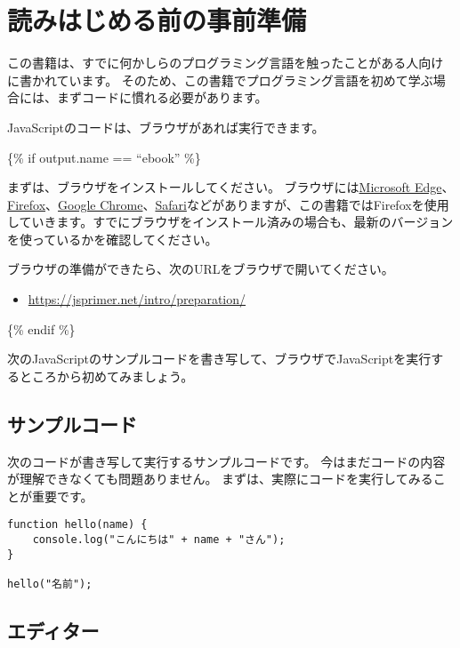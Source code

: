 \hypertarget{preparation}{%
\chapter*{読みはじめる前の事前準備}\label{preparation}}

この書籍は、すでに何かしらのプログラミング言語を触ったことがある人向けに書かれています。
そのため、この書籍でプログラミング言語を初めて学ぶ場合には、まずコードに慣れる必要があります。

JavaScriptのコードは、ブラウザがあれば実行できます。

\{\% if output.name == ``ebook'' \%\}

まずは、ブラウザをインストールしてください。
ブラウザには\href{https://www.microsoft.com/ja-jp/windows/microsoft-edge}{Microsoft
Edge}、\href{https://www.mozilla.org/ja/firefox/new/}{Firefox}、\href{https://www.google.com/intl/ja_ALL/chrome/}{Google
Chrome}、\href{https://www.apple.com/jp/safari/}{Safari}などがありますが、この書籍ではFirefoxを使用していきます。すでにブラウザをインストール済みの場合も、最新のバージョンを使っているかを確認してください。

ブラウザの準備ができたら、次のURLをブラウザで開いてください。

\begin{itemize}
\item
  \url{https://jsprimer.net/intro/preparation/}
\end{itemize}

\{\% endif \%\}

次のJavaScriptのサンプルコードを書き写して、ブラウザでJavaScriptを実行するところから初めてみましょう。

\hypertarget{samplecode}{%
\section*{サンプルコード}\label{samplecode}}

次のコードが書き写して実行するサンプルコードです。
今はまだコードの内容が理解できなくても問題ありません。
まずは、実際にコードを実行してみることが重要です。

\begin{lstlisting}
function hello(name) {
    console.log("こんにちは" + name + "さん");
}

hello("名前");
\end{lstlisting}

\hypertarget{editor}{%
\section*{エディター}\label{editor}}

